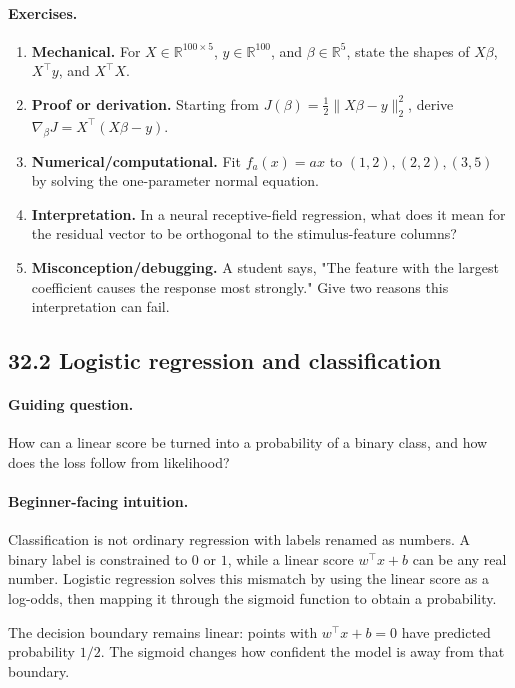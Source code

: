 \paragraph{Exercises.}
\begin{enumerate}[label=\textbf{32.1.\arabic*.}, leftmargin=*]
\item \textbf{Mechanical.} For \(X\in\mathbb R^{100\times 5}\), \(y\in\mathbb R^{100}\), and \(\beta\in\mathbb R^5\), state the shapes of \(X\beta\), \(X^\top y\), and \(X^\top X\).
\item \textbf{Proof or derivation.} Starting from \(J(\beta)=\frac12\|X\beta-y\|_2^2\), derive \(\nabla_\beta J=X^\top(X\beta-y)\).
\item \textbf{Numerical/computational.} Fit \(f_a(x)=a x\) to \((1,2),(2,2),(3,5)\) by solving the one-parameter normal equation.
\item \textbf{Interpretation.} In a neural receptive-field regression, what does it mean for the residual vector to be orthogonal to the stimulus-feature columns?
\item \textbf{Misconception/debugging.} A student says, "The feature with the largest coefficient causes the response most strongly." Give two reasons this interpretation can fail.
\end{enumerate}

\subsection{32.2 Logistic regression and classification}

\paragraph{Guiding question.}
How can a linear score be turned into a probability of a binary class, and how does the loss follow from likelihood?

\paragraph{Beginner-facing intuition.}
Classification is not ordinary regression with labels renamed as numbers. A binary label is constrained to \(0\) or \(1\), while a linear score \(w^\top x+b\) can be any real number. Logistic regression solves this mismatch by using the linear score as a log-odds, then mapping it through the sigmoid function to obtain a probability.

The decision boundary remains linear: points with \(w^\top x+b=0\) have predicted probability \(1/2\). The sigmoid changes how confident the model is away from that boundary.

